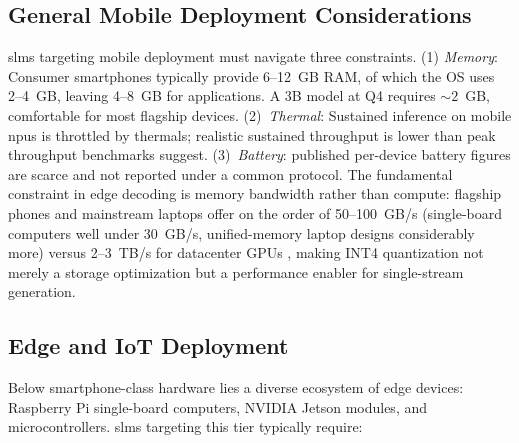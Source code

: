 \subsection{General Mobile Deployment Considerations}

\glspl{slm} targeting mobile deployment must navigate three constraints. (1) \emph{Memory}: Consumer smartphones typically provide 6--12~GB RAM, of which the OS uses 2--4~GB, leaving 4--8~GB for applications. A 3B model at Q4 requires ${\sim}2$~GB, comfortable for most flagship devices. (2)~\emph{Thermal}: Sustained inference on mobile \glspl{npu} is throttled by thermals; realistic sustained throughput is lower than peak throughput benchmarks suggest. (3)~\emph{Battery}: published per-device battery figures are scarce and not reported under a common protocol. The fundamental constraint in edge decoding is memory bandwidth rather than compute: flagship phones and mainstream laptops offer on the order of 50--100~GB/s (single-board computers well under 30~GB/s, unified-memory laptop designs considerably more) versus 2--3~TB/s for datacenter GPUs \citep{xu2024device}, making INT4 quantization not merely a storage optimization but a performance enabler for single-stream generation.

\subsection{Edge and IoT Deployment}
\label{subsec:deployment_edge}

Below smartphone-class hardware lies a diverse ecosystem of edge devices: Raspberry Pi single-board computers, NVIDIA Jetson modules, and microcontrollers. \glspl{slm} targeting this tier typically require:

